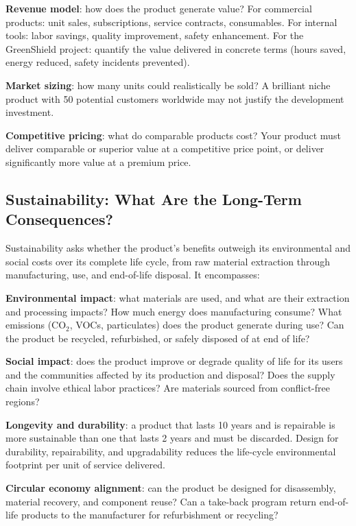 \documentclass[11pt,letterpaper,twoside,openany]{book}
\begin{document}
\textbf{Revenue model}: how does the product generate value? For commercial products: unit sales, subscriptions, service contracts, consumables. For internal tools: labor savings, quality improvement, safety enhancement. For the GreenShield project: quantify the value delivered in concrete terms (hours saved, energy reduced, safety incidents prevented).

\textbf{Market sizing}: how many units could realistically be sold? A brilliant niche product with 50 potential customers worldwide may not justify the development investment.

\textbf{Competitive pricing}: what do comparable products cost? Your product must deliver comparable or superior value at a competitive price point, or deliver significantly more value at a premium price.

\subsection{Sustainability: What Are the Long-Term Consequences?}
Sustainability asks whether the product's benefits outweigh its environmental and social costs over its complete life cycle, from raw material extraction through manufacturing, use, and end-of-life disposal. It encompasses:

\textbf{Environmental impact}: what materials are used, and what are their extraction and processing impacts? How much energy does manufacturing consume? What emissions (CO$_2$, VOCs, particulates) does the product generate during use? Can the product be recycled, refurbished, or safely disposed of at end of life?

\textbf{Social impact}: does the product improve or degrade quality of life for its users and the communities affected by its production and disposal? Does the supply chain involve ethical labor practices? Are materials sourced from conflict-free regions?

\textbf{Longevity and durability}: a product that lasts 10 years and is repairable is more sustainable than one that lasts 2 years and must be discarded. Design for durability, repairability, and upgradability reduces the life-cycle environmental footprint per unit of service delivered.

\textbf{Circular economy alignment}: can the product be designed for disassembly, material recovery, and component reuse? Can a take-back program return end-of-life products to the manufacturer for refurbishment or recycling?
\end{document}
